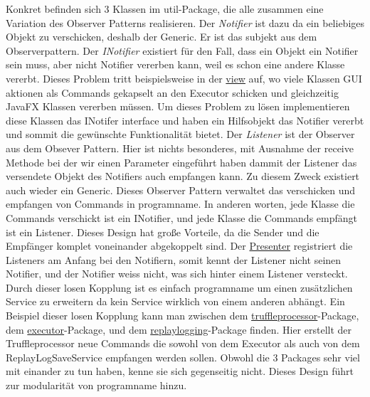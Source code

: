 Konkret befinden sich 3 Klassen im util-Package, die alle zusammen eine
Variation des Observer Patterns realisieren. Der \textit{Notifier} ist dazu da
ein beliebiges Objekt zu verschicken, deshalb der Generic. Er ist das subjekt aus
dem Observerpattern.
\newline
\newline
Der \textit{INotifier} existiert für den Fall, dass ein
Objekt ein Notifier sein muss, aber nicht Notifier vererben kann, weil es
schon eine andere Klasse vererbt. Dieses Problem tritt beispielsweise in der
\hyperref[subsec:view]{view} auf, wo viele Klassen GUI aktionen als Commands
gekapselt an den Executor schicken und gleichzeitig JavaFX Klassen vererben müssen.
Um dieses Problem zu lösen implementieren diese Klassen das INotifer interface
und haben ein Hilfsobjekt das Notifier vererbt und sommit die gewünschte Funktionalität
bietet.
\newline
\newline
Der \textit{Listener} ist der Observer aus dem Obsever Pattern. Hier ist nichts
besonderes, mit Ausnahme der receive Methode bei der wir einen Parameter eingeführt
haben dammit der Listener das versendete Objekt des Notifiers auch empfangen kann.
Zu diesem Zweck existiert auch wieder ein Generic.
\newline
\newline
Dieses Observer Pattern verwaltet das verschicken und empfangen von Commands in
\gls{programname}. In anderen worten, jede Klasse die Commands verschickt ist ein
INotifier, und jede Klasse die Commands empfängt ist ein Listener. Dieses Design
hat große Vorteile, da die Sender und die Empfänger komplet voneinander abgekoppelt
sind. Der \hyperref[subsec:presenter]{Presenter} registriert die Listeners am
Anfang bei den Notifiern, somit kennt der Listener nicht seinen Notifier, und der
Notifier weiss nicht, was sich hinter einem Listener versteckt. Durch dieser losen
Kopplung ist es einfach \gls{programname} um einen zusätzlichen Service zu erweitern
da kein Service wirklich von einem anderen abhängt.
\newline
\newline
Ein Beispiel dieser losen Kopplung kann man zwischen dem
\hyperref[subsubsec:truffleprocessor]{truffleprocessor}-Package, dem
\hyperref[subsubsec:executor]{executor}-Package, und dem
\hyperref[subsubsec:replaylogging]{replaylogging}-Package finden. Hier erstellt
der Truffleprocessor neue Commands die sowohl von dem Executor als auch von dem
ReplayLogSaveService empfangen werden sollen. Obwohl die 3 Packages sehr viel
mit einander zu tun haben, kenne sie sich gegenseitig nicht. Dieses Design
führt zur modularität von \gls{programname} hinzu.

